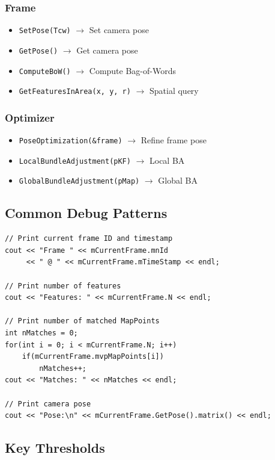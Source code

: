 \subsubsection{Frame}
\begin{itemize}
    \item \texttt{SetPose(Tcw)} $\rightarrow$ Set camera pose
    \item \texttt{GetPose()} $\rightarrow$ Get camera pose
    \item \texttt{ComputeBoW()} $\rightarrow$ Compute Bag-of-Words
    \item \texttt{GetFeaturesInArea(x, y, r)} $\rightarrow$ Spatial query
\end{itemize}

\subsubsection{Optimizer}
\begin{itemize}
    \item \texttt{PoseOptimization(\&frame)} $\rightarrow$ Refine frame pose
    \item \texttt{LocalBundleAdjustment(pKF)} $\rightarrow$ Local BA
    \item \texttt{GlobalBundleAdjustment(pMap)} $\rightarrow$ Global BA
\end{itemize}

\subsection{Common Debug Patterns}

\begin{lstlisting}[caption={Useful debug prints}]
// Print current frame ID and timestamp
cout << "Frame " << mCurrentFrame.mnId 
     << " @ " << mCurrentFrame.mTimeStamp << endl;

// Print number of features
cout << "Features: " << mCurrentFrame.N << endl;

// Print number of matched MapPoints
int nMatches = 0;
for(int i = 0; i < mCurrentFrame.N; i++)
    if(mCurrentFrame.mvpMapPoints[i])
        nMatches++;
cout << "Matches: " << nMatches << endl;

// Print camera pose
cout << "Pose:\n" << mCurrentFrame.GetPose().matrix() << endl;
\end{lstlisting}

\subsection{Key Thresholds}

